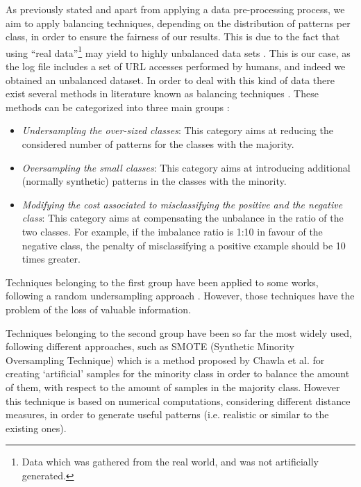 \documentclass{llncs}
\begin{document}
As previously stated and apart from applying a data pre-processing process, we aim to apply balancing techniques, depending on the distribution of patterns per class, in order to ensure the fairness of our results. This is due to the fact that using ``real data''\footnote{Data which was gathered from the real world, and was not artificially generated.} may yield to highly unbalanced data sets \cite{imbalanced_data_05}. This is our case, as the log file includes a set of URL accesses performed by humans, and indeed we obtained an unbalanced dataset. In order to deal with this kind of data there exist several methods in literature known as balancing techniques \cite{imbalanced_data_05}. These methods can be categorized into three main groups \cite{imbalance_techniques_02}: 

\begin{itemize}
\item \textit{Undersampling the over-sized classes}: This category aims at reducing the considered number of patterns for the classes with the majority.
\item \textit{Oversampling the small classes}: This category aims at introducing additional (normally synthetic) patterns in the classes with the minority.
\item \textit{Modifying the cost associated to misclassifying the positive and the negative class}: This category aims at compensating the unbalance in the ratio of the two classes. For example, if the imbalance ratio is 1:10 in favour of the negative class, the penalty of misclassifying a positive example should be 10 times greater.
\end{itemize}

Techniques belonging to the first group have been applied to some works, following a random undersampling approach \cite{random_undersampling_08}. However, those techniques have the problem of the loss of valuable information. 

Techniques belonging to the second  group have been so far the most widely used, following different approaches, such as SMOTE (Synthetic Minority Oversampling Technique) \cite{smote_02} which is a method proposed by Chawla et al. for creating `artificial' samples for the minority class in order to balance the amount of them, with respect to the amount of samples in the majority class. However this technique is based on numerical computations, considering  different distance measures, in order to generate useful patterns  (i.e. realistic or similar to the existing ones).
\end{document}
